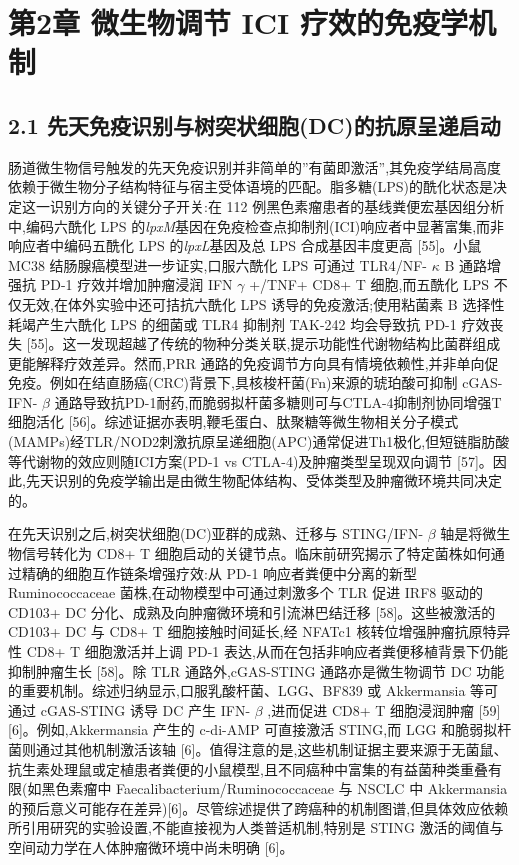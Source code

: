 \section{第2章 微生物调节 ICI 疗效的免疫学机制}\label{ux7b2c2ux7ae0-ux5faeux751fux7269ux8c03ux8282-ici-ux7597ux6548ux7684ux514dux75abux5b66ux673aux5236}

\subsection{2.1 先天免疫识别与树突状细胞(DC)的抗原呈递启动}\label{ux5148ux5929ux514dux75abux8bc6ux522bux4e0eux6811ux7a81ux72b6ux7ec6ux80dedcux7684ux6297ux539fux5448ux9012ux542fux52a8}

肠道微生物信号触发的先天免疫识别并非简单的''有菌即激活'',其免疫学结局高度依赖于微生物分子结构特征与宿主受体语境的匹配。脂多糖(LPS)的酰化状态是决定这一识别方向的关键分子开关:在 112 例黑色素瘤患者的基线粪便宏基因组分析中,编码六酰化 LPS 的\emph{lpxM}基因在免疫检查点抑制剂(ICI)响应者中显著富集,而非响应者中编码五酰化 LPS 的\emph{lpxL}基因及总 LPS 合成基因丰度更高 {[}55{]}。小鼠 MC38 结肠腺癌模型进一步证实,口服六酰化 LPS 可通过 TLR4/NF- \(\kappa\) B 通路增强抗 PD-1 疗效并增加肿瘤浸润 IFN \(\gamma\) +/TNF+ CD8+ T 细胞,而五酰化 LPS 不仅无效,在体外实验中还可拮抗六酰化 LPS 诱导的免疫激活;使用粘菌素 B 选择性耗竭产生六酰化 LPS 的细菌或 TLR4 抑制剂 TAK-242 均会导致抗 PD-1 疗效丧失 {[}55{]}。这一发现超越了传统的物种分类关联,提示功能性代谢物结构比菌群组成更能解释疗效差异。然而,PRR 通路的免疫调节方向具有情境依赖性,并非单向促免疫。例如在结直肠癌(CRC)背景下,具核梭杆菌(Fn)来源的琥珀酸可抑制 cGAS-IFN- \(\beta\) 通路导致抗PD-1耐药,而脆弱拟杆菌多糖则可与CTLA-4抑制剂协同增强T细胞活化 {[}56{]}。综述证据亦表明,鞭毛蛋白、肽聚糖等微生物相关分子模式(MAMPs)经TLR/NOD2刺激抗原呈递细胞(APC)通常促进Th1极化,但短链脂肪酸等代谢物的效应则随ICI方案(PD-1 vs CTLA-4)及肿瘤类型呈现双向调节 {[}57{]}。因此,先天识别的免疫学输出是由微生物配体结构、受体类型及肿瘤微环境共同决定的。

在先天识别之后,树突状细胞(DC)亚群的成熟、迁移与 STING/IFN- \(\beta\) 轴是将微生物信号转化为 CD8+ T 细胞启动的关键节点。临床前研究揭示了特定菌株如何通过精确的细胞互作链条增强疗效:从 PD-1 响应者粪便中分离的新型 Ruminococcaceae 菌株,在动物模型中可通过刺激多个 TLR 促进 IRF8 驱动的 CD103+ DC 分化、成熟及向肿瘤微环境和引流淋巴结迁移 {[}58{]}。这些被激活的 CD103+ DC 与 CD8+ T 细胞接触时间延长,经 NFATc1 核转位增强肿瘤抗原特异性 CD8+ T 细胞激活并上调 PD-1 表达,从而在包括非响应者粪便移植背景下仍能抑制肿瘤生长 {[}58{]}。除 TLR 通路外,cGAS-STING 通路亦是微生物调节 DC 功能的重要机制。综述归纳显示,口服乳酸杆菌、LGG、BF839 或 Akkermansia 等可通过 cGAS-STING 诱导 DC 产生 IFN- \(\beta\) ,进而促进 CD8+ T 细胞浸润肿瘤 {[}59{]}{[}6{]}。例如,Akkermansia 产生的 c-di-AMP 可直接激活 STING,而 LGG 和脆弱拟杆菌则通过其他机制激活该轴 {[}6{]}。值得注意的是,这些机制证据主要来源于无菌鼠、抗生素处理鼠或定植患者粪便的小鼠模型,且不同癌种中富集的有益菌种类重叠有限(如黑色素瘤中 Faecalibacterium/Ruminococcaceae 与 NSCLC 中 Akkermansia 的预后意义可能存在差异){[}6{]}。尽管综述提供了跨癌种的机制图谱,但具体效应依赖所引用研究的实验设置,不能直接视为人类普适机制,特别是 STING 激活的阈值与空间动力学在人体肿瘤微环境中尚未明确 {[}6{]}。

